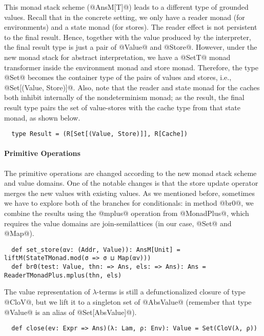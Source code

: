 This monad stack scheme (@AnsM[T]@) leads to a different type of grounded
values. Recall that in the concrete setting, we only have a reader monad (for
environments) and a state monad (for stores). The reader effect is not
persistent to the final result. Hence, together with the value produced by the
interpreter, the final result type is just a pair of @Value@ and @Store@.
However, under the new monad stack for abstract interpretation, we have a
@SetT@ monad transformer inside the environment monad and store monad. Therefore, the type
@Set@ becomes the container type of the pairs of values and stores, i.e.,
@Set[(Value, Store)]@.  Also, note that the reader and state monad for the
caches both inhibit internally of the nondeterminism monad; as the result, the
final result type pairs the set of value-stores with the cache type from
that state monad, as shown below.
\begin{lstlisting}
  type Result = (R[Set[(Value, Store)]], R[Cache])
\end{lstlisting}

\paragraph{Primitive Operations} The primitive operations are changed according
to the new monad stack scheme and value domains. One of the notable changes is
that the store update operator merges the new values with existing values.  As
we mentioned before, sometimes we have to explore both of the branches for
conditionals: in method @br0@, we combine the results using the @mplus@
operation from @MonadPlus@, which requires the value domains are
join-semilattices (in our case, @Set@ and @Map@).
\begin{lstlisting}
  def set_store(αv: (Addr, Value)): AnsM[Unit] = liftM(StateTMonad.mod(σ => σ ⊔ Map(αv)))
  def br0(test: Value, thn: => Ans, els: => Ans): Ans = ReaderTMonadPlus.mplus(thn, els)
\end{lstlisting}

The value representation of $\lambda$-terms is still a defunctionalized closure of
type @CloV@, but we lift it to a singleton set of @AbsValue@ (remember that
type @Value@ is an alias of @Set[AbsValue]@).
\begin{lstlisting}
  def close(ev: Expr => Ans)(λ: Lam, ρ: Env): Value = Set(CloV(λ, ρ))
\end{lstlisting}

